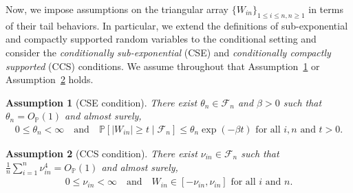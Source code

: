 \documentclass[12pt]{article}
\newtheorem{assumption}{Assumption}
\theoremstyle{definition}
\def\P{\mathbb{P}}
\def\P{\mathbb{P}}
\renewcommand{\P}{\mathbb{P}}							%
\begin{document}
  Now, we impose assumptions on the triangular array $\{W_{in}\}_{1 \leq i \leq n, n \geq 1}$ in terms of their tail behaviors. In particular, we extend the definitions of sub-exponential and compactly supported random variables to the conditional setting and consider the \textit{conditionally sub-exponential} (CSE) and \textit{conditionally compactly supported} (CCS) conditions. We assume throughout that Assumption~\ref{assu:cse} or Assumption~\ref{assu:ccs} holds.
  \begin{assumption}[CSE condition]\label{assu:cse}
  There exist $\theta_n \in \mathcal F_n$ and $\beta > 0$ such that $\theta_n=O_{\P}(1)$ and almost surely,
  \begin{align*}
	0\leq \theta_n < \infty\quad\text{and}\quad\P[|W_{in}|\geq t\mid \mathcal{F}_n]\leq \theta_n\exp(-\beta t)\text{ for all $i,n$ and $t>0$}.
  \end{align*}
  \end{assumption}
  \begin{assumption}[CCS condition]\label{assu:ccs}
  There exist $\nu_{in} \in \mathcal F_n$ such that $\frac{1}{n}\sum_{i=1}^n \nu_{in}^4=O_{\P}(1)$ and almost surely,
  \begin{align*}
	0\leq \nu_{in}<\infty\quad\text{and}\quad W_{in}\in[-\nu_{in},\nu_{in}]\text{ for all $i$ and $n$}.
  \end{align*}
  \end{assumption}
  
\end{document}
